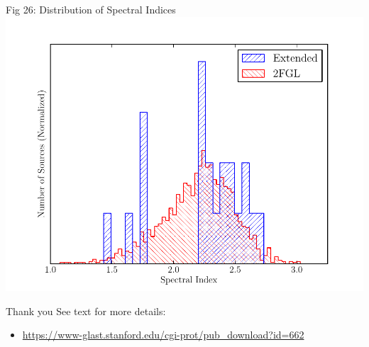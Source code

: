 \documentclass[12pt]{beamer}
\begin{document}
\begin{frame}{Fig 26: Distribution of Spectral Indices}
  \includegraphics[scale=0.40]{plots/compare_index_2FGL_color.pdf}
\end{frame}

\begin{frame}{Thank you}
  See text for more details:
  \begin{itemize}
    \item
  \url{https://www-glast.stanford.edu/cgi-prot/pub_download?id=662}
  \end{itemize}

\end{frame}
\end{document}
